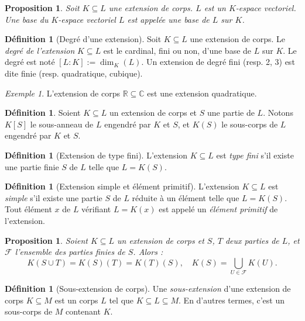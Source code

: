 \documentclass[a4paper, titlepage]{article}
\newtheorem{prop}[theo]{Proposition}
\theoremstyle{definition}
\newtheorem{defi}[theo]{Définition}
\theoremstyle{remark}
\newtheorem{exem}[theo]{Exemple}
\def\R{\mathbb R}
\def\C{\mathbb C}
\begin{document}
\begin{prop}
Soit $K \subseteq L$ une extension de corps. $L$ est un $K$-espace vectoriel. Une base du $K$-espace vectoriel $L$ est appelée une base de $L$ sur $K$.
\end{prop}

\begin{defi}[Degré d'une extension]
Soit $K \subseteq L$ une extension de corps. Le \textit{degré de l'extension} $K \subseteq L$ est le cardinal, fini ou non, d'une base de $L$ sur $K$. Le degré est noté $[L:K] := \dim_K(L)$. Un extension de degré fini (resp. 2, 3) est dite finie (resp. quadratique, cubique).
\end{defi}

\begin{exem}
L'extension de corps $\R \subseteq \C$ est une extension quadratique.
\end{exem}

\begin{defi}
Soient $K\subseteq L$ un extension de corps et $S$ une partie de $L$. Notons $K[S]$ le sous-anneau de $L$ engendré par $K$ et $S$, et $K(S)$ le sous-corps de $L$ engendré par $K$ et $S$.
\end{defi}

\begin{defi}[Extension de type fini]
L'extension $K \subseteq L$ est \textit{type fini} s'il existe une partie finie $S$ de $L$ telle que $L=K(S)$.
\end{defi}

\begin{defi}[Extension simple et élément primitif]
L'extension $K \subseteq L$ est \textit{simple} s'il existe une partie $S$ de $L$ réduite à un élément telle que $L=K(S)$.
Tout élément $x$ de $L$ vérifiant $L=K(x)$ est appelé un \textit{élément primitif} de l'extension.
\end{defi}

\begin{prop}
Soient $K \subseteq L$ un extension de corps et $S$, $T$ deux parties de $L$, et $\mathcal F$ l'ensemble des parties finies de $S$. Alors :
$$K( S \cup T) = K(S)(T) = K(T)(S), \quad K(S) = \bigcup_{U\in\mathcal F} K(U).$$
\end{prop}

\begin{defi}[Sous-extension de corps]
Une \textit{sous-extension} d'une extension de corps $K\subseteq M$ est un corps $L$ tel que $K\subseteq L \subseteq M$. En d'autres termes, c'est un sous-corps de $M$ contenant $K$.
\end{defi}
\end{document}
